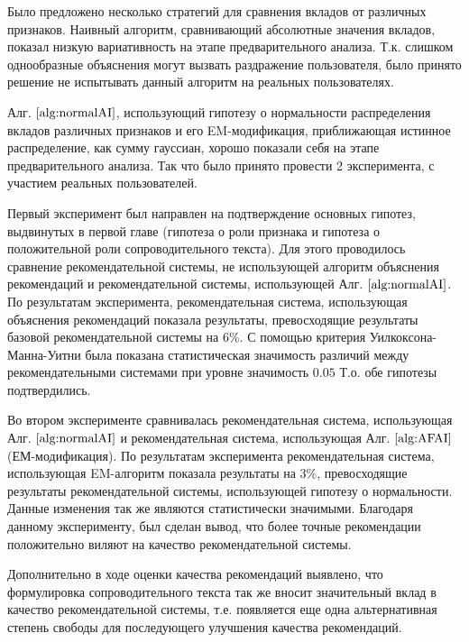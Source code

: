 \documentclass[12pt,a4paper]{report}
\begin{document}
Было предложено несколько стратегий для сравнения вкладов от различных признаков. Наивный алгоритм, сравнивающий абсолютные значения вкладов, показал низкую вариативность на этапе предварительного анализа. Т.к. слишком однообразные объяснения могут вызвать раздражение пользователя, было принято решение не испытывать данный алгоритм на реальных пользователях.

Алг. $\ref{alg:normalAI}$, использующий гипотезу о нормальности распределения вкладов различных признаков и его EM-модификация, приближающая истинное распределение, как сумму гауссиан, хорошо показали себя на этапе предварительного анализа. Так что было принято провести 2 эксперимента, с участием реальных пользователей.

Первый эксперимент был направлен на подтверждение основных гипотез, выдвинутых в первой главе (гипотеза о роли признака и гипотеза о положительной роли сопроводительного текста). Для этого проводилось сравнение рекомендательной системы, не использующей алгоритм объяснения рекомендаций и рекомендательной системы, использующей Алг. $\ref{alg:normalAI}$. По результатам эксперимента, рекомендательная система, использующая объяснения рекомендаций показала результаты, превосходящие результаты базовой рекомендательной системы на 6\%. С помощью критерия Уилкоксона-Манна-Уитни была показана статистическая значимость различий между рекомендательными системами при уровне значимость $0.05$ Т.о. обе гипотезы подтвердились.

Во втором эксперименте сравнивалась рекомендательная система, использующая Алг. $\ref{alg:normalAI}$ и рекомендательная система, использующая Алг. $\ref{alg:AFAI}$ (ЕМ-модификация). По результатам эксперимента рекомендательная система, использующая EM-алгоритм показала результаты на 3\%, превосходящие результаты рекомендательной системы, использующей гипотезу о нормальности. Данные изменения так же являются статистически значимыми. Благодаря данному эксперименту, был сделан вывод, что более точные рекомендации положительно виляют на качество рекомендательной системы.

Дополнительно в ходе оценки качества рекомендаций выявлено, что формулировка сопроводительного текста так же вносит значительный вклад в качество рекомендательной системы, т.е. появляется еще одна альтернативная степень свободы для последующего улучшения качества рекомендаций.

  
\end{document}
